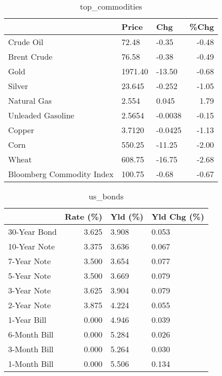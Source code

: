 \documentclass{article}%
\begin{document}
\begin{table}[htbp]%
\caption{top\_commodities}%
\centering%
\begin{adjustbox}{width=1\textwidth}%
\begin{tabular}{lllr}
\toprule
                          &   Price &     Chg &  \%Chg \\
\midrule
               Crude Oil  &   72.48 &   -0.35 & -0.48 \\
             Brent Crude  &   76.58 &   -0.38 & -0.49 \\
                    Gold  & 1971.40 &  -13.50 & -0.68 \\
                  Silver  &  23.645 &  -0.252 & -1.05 \\
             Natural Gas  &   2.554 &   0.045 &  1.79 \\
       Unleaded Gasoline  &  2.5654 & -0.0038 & -0.15 \\
                  Copper  &  3.7120 & -0.0425 & -1.13 \\
                    Corn  &  550.25 &  -11.25 & -2.00 \\
                   Wheat  &  608.75 &  -16.75 & -2.68 \\
Bloomberg Commodity Index &  100.75 &   -0.68 & -0.67 \\
\bottomrule
\end{tabular}
%
\end{adjustbox}%
\end{table}

%


\begin{table}[htbp]%
\caption{us\_bonds}%
\centering%
\begin{adjustbox}{width=1\textwidth}%
\begin{tabular}{lrll}
\toprule
             &  Rate (\%) & Yld (\%) & Yld Chg (\%) \\
\midrule
30-Year Bond &     3.625 &   3.908 &       0.053 \\
10-Year Note &     3.375 &   3.636 &       0.067 \\
 7-Year Note &     3.500 &   3.654 &       0.077 \\
 5-Year Note &     3.500 &   3.669 &       0.079 \\
 3-Year Note &     3.625 &   3.904 &       0.079 \\
 2-Year Note &     3.875 &   4.224 &       0.055 \\
 1-Year Bill &     0.000 &   4.946 &       0.039 \\
6-Month Bill &     0.000 &   5.284 &       0.026 \\
3-Month Bill &     0.000 &   5.264 &       0.030 \\
1-Month Bill &     0.000 &   5.506 &       0.134 \\
\bottomrule
\end{tabular}
%
\end{adjustbox}%
\end{table}
\end{document}
